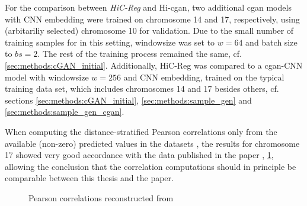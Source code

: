 For the comparison between \emph{HiC-Reg} and Hi-\acrshort{cgan}, two additional \acrshort{cgan} models with CNN embedding were trained on chromosome 14 and 17, respectively,
using (arbitariliy selected) chromosome 10 for validation. 
Due to the small number of training samples for in this setting, windowsize was set to $w=64$ and batch size to $bs=2$.
The rest of the training process remained the same, cf. \cref{sec:methods:cGAN_initial}.
Additionally, HiC-Reg was compared to a \acrshort{cgan}-CNN model with windowsize $w=256$ and CNN embedding, trained on the typical training data set, 
which includes chromosomes 14 and 17 besides others, cf. sections \ref{sec:methods:cGAN_initial}, \ref{sec:methods:sample_gen} and \ref{sec:methods:sample_gen_cgan}.

When computing the distance-stratified Pearson correlations only from the available (non-zero) predicted values in the datasets \cite{ShiluZhang2019,ShiluZhang2019a},
the results for chromosome 17 showed very good accordance with the data published in the paper \cite[fig.\,10]{Zhang2019}, \cref{fig:methods:zhang_correlations_reconstructed},
allowing the conclusion that the correlation computations should in principle be comparable between this thesis and the paper.
\begin{figure}[htbp]
 \begin{subfigure}{0.45\textwidth}
 \end{subfigure}\hfill
 \begin{subfigure}{0.45\textwidth}
 \end{subfigure}
\caption{Pearson correlations reconstructed from \cite{Zhang2019}} \label{fig:methods:zhang_correlations_reconstructed}
\end{figure}

